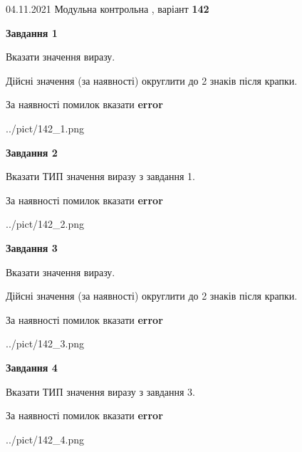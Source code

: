 \documentclass[11pt, ukrainian]{article}
\begin{document}
{04.11.2021 Модульна контрольна , варіант  \No \textbf { 142 }\par}
{
\begin {large}
{\begin {center}\textbf{Завдання 1}\end {center}}\par
Вказати значення виразу. \par
Дійсні значення (за наявності) округлити до 2 знаків після крапки. \par
За наявності помилок вказати \textbf{error}

\begin{center}
	{../pict/142_1.png}
\end{center}
\newpage

{\begin {center}\textbf{Завдання 2}\end {center}}\par
Вказати ТИП значення виразу з завдання 1. \par
За наявності помилок вказати \textbf{error}

\begin{center}
	{../pict/142_2.png}
\end{center}
\newpage

{\begin {center}\textbf{Завдання 3}\end {center}}\par
Вказати значення виразу. \par
Дійсні значення (за наявності) округлити до 2 знаків після крапки. \par
За наявності помилок вказати \textbf{error}

\begin{center}
	{../pict/142_3.png}
\end{center}
\newpage

{\begin {center}\textbf{Завдання 4}\end {center}}\par
Вказати ТИП значення виразу з завдання 3. \par
За наявності помилок вказати \textbf{error}

\begin{center}
	{../pict/142_4.png}
\end{center}
\newpage


\end{large}}
\end{document}
